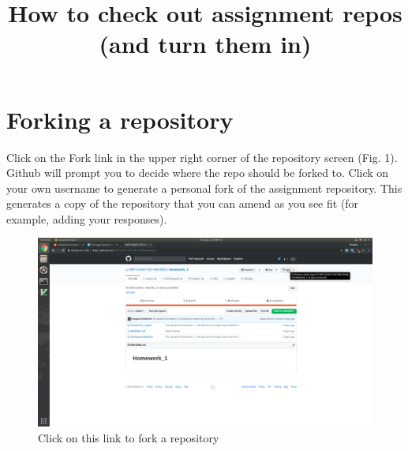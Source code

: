\documentclass{article}
\begin{document}
\title{How to check out assignment repos (and turn them in)}

\maketitle
\section{Forking a repository}
Click on the Fork link in the upper right corner of the repository screen (Fig. 1).  Github will prompt you to decide where the repo should be forked to.  Click on your own username to generate a personal fork of the assignment repository.  This generates a copy of the repository that you can amend as you see fit (for example, adding your responses).  
\begin{figure}[h!]
\includegraphics[width=\linewidth]{fork.png}
\caption{Click on this link to fork a repository}
\end{figure}

\newpage
\end{document}
